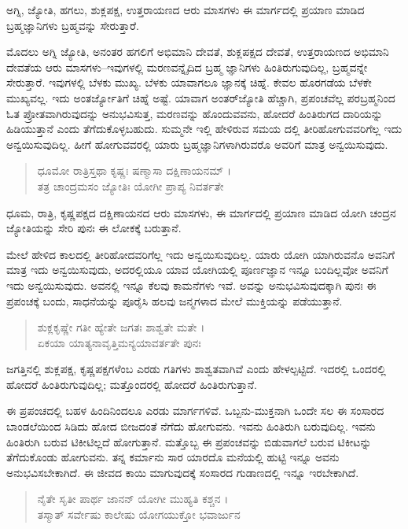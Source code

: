 {\small ಅಗ್ನಿ, ಜ್ಯೋತಿ, ಹಗಲು, ಶುಕ್ಲಪಕ್ಷ, ಉತ್ತರಾಯಣದ ಆರು ಮಾಸಗಳು ಈ ಮಾರ್ಗದಲ್ಲಿ ಪ್ರಯಾಣ ಮಾಡಿದ ಬ್ರಹ್ಮಜ್ಞಾನಿಗಳು ಬ್ರಹ್ಮವನ್ನು ಸೇರುತ್ತಾರೆ.}

ಮೊದಲು ಅಗ್ನಿ ಜ್ಯೋತಿ, ಅನಂತರ ಹಗಲಿಗೆ ಅಭಿಮಾನಿ ದೇವತೆ, ಶುಕ್ಲಪಕ್ಷದ ದೇವತೆ, ಉತ್ತರಾಯಣದ ಅಭಿಮಾನಿ ದೇವತೆಯ ಆರು ಮಾಸಗಳು–ಇವುಗಳಲ್ಲಿ ಮರಣವನ್ನೈದಿದ ಬ್ರಹ್ಮ ಜ್ಞಾನಿಗಳು ಹಿಂತಿರುಗುವುದಿಲ್ಲ, ಬ್ರಹ್ಮವನ್ನೇ ಸೇರುತ್ತಾರೆ. ಇವುಗಳಲ್ಲಿ ಬೆಳಕು ಮುಖ್ಯ. ಬೆಳಕು ಯಾವಾಗಲೂ ಜ್ಞಾನಕ್ಕೆ ಚಿಹ್ನೆ. ಕೇವಲ ಹೊರಗಡೆಯ ಬೆಳಕೇ ಮುಖ್ಯವಲ್ಲ. ಇದು ಅಂತರ್ಜ್ಯೋತಿಗೆ ಚಿಹ್ನೆ ಅಷ್ಟೆ. ಯಾವಾಗ ಅಂತರ್​ಜ್ಯೋತಿ ಹೆಚ್ಚಾಗಿ, ಪ್ರಪಂಚವೆಲ್ಲ ಪರಬ್ರಹ್ಮನಿಂದ ಓತ ಪ್ರೋತವಾಗಿರುವುದನ್ನು ಅನುಭವಿಸುತ್ತ, ಮರಣವನ್ನು ಹೊಂದುವವನು, ಹೋದರೆ ಹಿಂತಿರುಗದ ದಾರಿಯನ್ನು ಹಿಡಿಯುತ್ತಾನೆ ಎಂದು ತೆಗೆದುಕೊಳ್ಳಬಹುದು. ಸುಮ್ಮನೇ ಇಲ್ಲಿ ಹೇಳಿರುವ ಸಮಯ ದಲ್ಲಿ ತೀರಿಹೋಗುವವರಿಗೆಲ್ಲ ಇದು ಅನ್ವಯಿಸುವುದಿಲ್ಲ. ಹೀಗೆ ಹೋಗುವವರಲ್ಲಿ ಯಾರು ಬ್ರಹ್ಮಜ್ಞಾನಿಗಳಾಗಿರುವರೊ ಅವರಿಗೆ ಮಾತ್ರ ಅನ್ವಯಿಸುವುದು.

\begin{verse}
ಧೂಮೋ ರಾತ್ರಿಸ್ತಥಾ ಕೃಷ್ಣಃ ಷಣ್ಮಾಸಾ ದಕ್ಷಿಣಾಯನಮ್ ।\\ತತ್ರ ಚಾಂದ್ರಮಸಂ ಜ್ಯೋತಿಃ ಯೋಗೀ ಪ್ರಾಪ್ಯ ನಿವರ್ತತೇ 
\end{verse}

{\small ಧೂಮ, ರಾತ್ರಿ, ಕೃಷ್ಣಪಕ್ಷದ ದಕ್ಷಿಣಾಯನದ ಆರು ಮಾಸಗಳು, ಈ ಮಾರ್ಗದಲ್ಲಿ ಪ್ರಯಾಣ ಮಾಡಿದ ಯೋಗಿ ಚಂದ್ರನ ಜ್ಯೋತಿಯನ್ನು ಸೇರಿ ಪುನಃ ಈ ಲೋಕಕ್ಕೆ ಬರುತ್ತಾನೆ.}

ಮೇಲೆ ಹೇಳಿದ ಕಾಲದಲ್ಲಿ ತೀರಿಹೋದವರಿಗೆಲ್ಲ ಇದು ಅನ್ವಯಿಸುವುದಿಲ್ಲ. ಯಾರು ಯೋಗಿ ಯಾಗಿರುವನೊ ಅವನಿಗೆ ಮಾತ್ರ ಇದು ಅನ್ವಯಿಸುವುದು, ಅದರಲ್ಲಿಯೂ ಯಾವ ಯೋಗಿಯಲ್ಲಿ ಪೂರ್ಣಜ್ಞಾನ ಇನ್ನೂ ಬಂದಿಲ್ಲವೋ ಅವನಿಗೆ ಇದು ಅನ್ವಯಿಸುವುದು. ಅವನಲ್ಲಿ ಇನ್ನೂ ಕೆಲವು ಕಾಮನೆಗಳು ಇವೆ. ಅವನ್ನು ಅನುಭವಿಸುವುದಕ್ಕಾಗಿ ಪುನಃ ಈ ಪ್ರಪಂಚಕ್ಕೆ ಬಂದು, ಸಾಧನೆಯನ್ನು ಪೂರೈಸಿ ಹಲವು ಜನ್ಮಗಳಾದ ಮೇಲೆ ಮುಕ್ತಿಯನ್ನು ಪಡೆಯುತ್ತಾನೆ.

\begin{verse}
ಶುಕ್ಲಕೃಷ್ಣೇ ಗತೀ ಹ್ಯೇತೇ ಜಗತಃ ಶಾಶ್ವತೇ ಮತೇ ।\\ಏಕಯಾ ಯಾತ್ಯನಾವೃತ್ತಿಮನ್ಯಯಾವರ್ತತೇ ಪುನಃ 
\end{verse}

{\small ಜಗತ್ತಿನಲ್ಲಿ ಶುಕ್ಲಪಕ್ಷ, ಕೃಷ್ಣಪಕ್ಷಗಳೆಂಬ ಎರಡು ಗತಿಗಳು ಶಾಶ್ವತವಾಗಿವೆ ಎಂದು ಹೇಳಲ್ಪಟ್ಟಿದೆ. ಇದರಲ್ಲಿ ಒಂದರಲ್ಲಿ ಹೋದರೆ ಹಿಂತಿರುಗುವುದಿಲ್ಲ; ಮತ್ತೊಂದರಲ್ಲಿ ಹೋದರೆ ಹಿಂತಿರುಗುತ್ತಾನೆ.}

ಈ ಪ್ರಪಂಚದಲ್ಲಿ ಬಹಳ ಹಿಂದಿನಿಂದಲೂ ಎರಡು ಮಾರ್ಗಗಳಿವೆ. ಒಬ್ಬನು-ಮುಕ್ತನಾಗಿ ಒಂದೇ ಸಲ ಈ ಸಂಸಾರದ ಬಾಂಡಲೆಯಿಂದ ಸಿಡಿದು ಹೋದ ಬೀಜದಂತೆ ನೆಗೆದು ಹೋಗುವನು. ಇವನು ಹಿಂತಿರುಗಿ ಬರುವುದಿಲ್ಲ. ಇವನು ಹಿಂತಿರುಗಿ ಬರುವ ಟಿಕೀಟಿಲ್ಲದೆ ಹೋಗುತ್ತಾನೆ. ಮತ್ತೊಬ್ಬ ಈ ಪ್ರಪಂಚವನ್ನು ಬಿಡುವಾಗಲೆ ಬರುವ ಟಿಕೀಟನ್ನು ತೆಗೆದುಕೊಂಡು ಹೋಗುವನು. ತನ್ನ ಕರ್ಮಾನು ಸಾರ ಯಾರದೊ ಮನೆಯಲ್ಲಿ ಹುಟ್ಟಿ ಇನ್ನೂ ಅವನು ಅನುಭವಿಸಬೇಕಾಗಿದೆ. ಈ ಜೀವದ ಕಾಯಿ ಮಾಗುವುದಕ್ಕೆ ಸಂಸಾರದ ಗುಡಾಣದಲ್ಲಿ ಇನ್ನೂ ಇರಬೇಕಾಗಿದೆ.

\begin{verse}
ನೈತೇ ಸೃತೀ ಪಾರ್ಥ ಜಾನನ್ ಯೋಗೀ ಮುಹ್ಯತಿ ಕಶ್ಚನ ।\\ತಸ್ಮಾತ್ ಸರ್ವೇಷು ಕಾಲೇಷು ಯೋಗಯುಕ್ತೋ ಭವಾರ್ಜುನ 
\end{verse}

